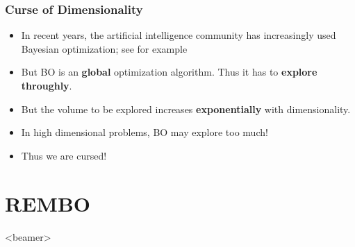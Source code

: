 \documentclass[grey]{beamer}
\begin{document}
 \begin{frame}
 \frametitle{Curse of Dimensionality}
  \begin{itemize}
   \item In recent years, the artificial intelligence community has increasingly used Bayesian optimization; see for example~\cite{Martinez-Cantin:2009,Brochu:2009,Srinivas:2010,Hoffman:2011,Lizotte:2011,Azimi:2012}
   \item But BO is an {\bf \textcolor{myColor}{global}} 
    optimization algorithm. Thus it has to 
    {\bf \textcolor{myColor}{explore throughly}}.
   \item But the volume to be explored increases 
   {\bf \textcolor{myColor}{exponentially}} with dimensionality.
   \item In high dimensional problems, BO may explore too much!
   \item Thus we are cursed!
   
  \end{itemize}
 \end{frame}

 

\section{REMBO}
 \begin{frame}<beamer>
  \tableofcontents[currentsection]
 \end{frame}
   
\end{document}
